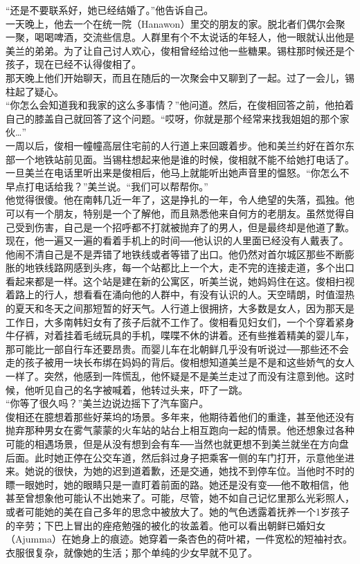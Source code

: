 “还是不要联系好，她已经结婚了。”他告诉自己。\\

一天晚上，他去一个在统一院（Hanawon）里交的朋友的家。脱北者们偶尔会聚一聚，喝喝啤酒，交流些信息。人群里有个不太说话的年轻人，他一眼就认出他是美兰的弟弟。为了让自己讨人欢心，俊相曾经给过他一些糖果。锡柱那时候还是个孩子，现在已经不认得俊相了。\\

那天晚上他们开始聊天，而且在随后的一次聚会中又聊到了一起。过了一会儿，锡柱起了疑心。\\

“你怎么会知道我和我家的这么多事情？”他问道。然后，在俊相回答之前，他拍着自己的膝盖自己就回答了这个问题。“哎呀，你就是那个经常来找我姐姐的那个家伙…”\\

一周以后，俊相一幢幢高层住宅前的人行道上来回踱着步。他和美兰约好在首尔东部一个地铁站前见面。当锡柱想起来他是谁的时候，俊相就不能不给她打电话了。一旦美兰在电话里听出来是俊相后，他马上就能听出她声音里的愠怒。“你怎么不早点打电话给我？”美兰说。“我们可以帮帮你。”\\

他觉得很傻。他在南韩几近一年了，这是挣扎的一年，令人绝望的失落，孤独。他可以有一个朋友，特别是一个了解他，而且熟悉他来自何方的老朋友。虽然觉得自己受到伤害，自己是一个招呼都不打就被抛弃了的男人，但是最终却是他道了歉。\\

现在，他一遍又一遍的看着手机上的时间──他认识的人里面已经没有人戴表了。他闹不清自己是不是弄错了地铁线或者等错了出口。他仍然对首尔城区那些不断膨胀的地铁线路网感到头疼，每一个站都比上一个大，走不完的连接走道，多个出口看起来都是一样。这个站是建在新的公寓区，听美兰说，她妈妈住在这。俊相扫视着路上的行人，想看看在涌向他的人群中，有没有认识的人。天空晴朗，时值湿热的夏天和冬天之间那短暂的好天气。人行道上很拥挤，大多数是女人，因为那天是工作日，大多南韩妇女有了孩子后就不工作了。俊相看见妇女们，一个个穿着紧身牛仔裤，对着挂着毛绒玩具的手机，喋喋不休的讲着。还有些推着精美的婴儿车，那可能比一部自行车还要昂贵。而婴儿车在北朝鲜几乎没有听说过──那些还不会走的孩子被用一块长布绑在妈妈的背后。俊相想知道美兰是不是和这些娇气的女人一样了。突然，他感到一阵慌乱，他怀疑是不是美兰走过了而没有注意到他。这时候，他听见自己的名字被喊着，他转过头来，吓了一跳。\\

“你等了很久吗？”美兰边说边摇下了汽车窗户。\\

俊相还在臆想着那些好莱坞的场景。多年来，他期待着他们的重逢，甚至他还没有抛弃那种男女在雾气蒙蒙的火车站的站台上相互跑向一起的情景。他还想象过各种可能的相遇场景，但是从没有想到会有车──当然也就更想不到美兰就坐在方向盘后面。此时她正停在公交车道，然后斜过身子把乘客一侧的车门打开，示意他坐进来。她说的很快，为她的迟到道着歉，还是交通，她找不到停车位。当他时不时的瞟一眼她时，她的眼睛只是一直盯着前面的路。她还是没有变──他不敢相信，他甚至曾想象他可能认不出她来了。可能，尽管，她不如自己记忆里那么光彩照人，或者可能她的美在自己多年的思念中被放大了。她的气色透露着抚养一个1岁孩子的辛劳；下巴上冒出的痤疮勉强的被化的妆盖着。他可以看出朝鲜已婚妇女（Ajumma）在她身上的痕迹。她穿着一条杏色的荷叶裙，一件宽松的短袖衬衣。衣服很复杂，就像她的生活；那个单纯的少女早就不见了。\\

